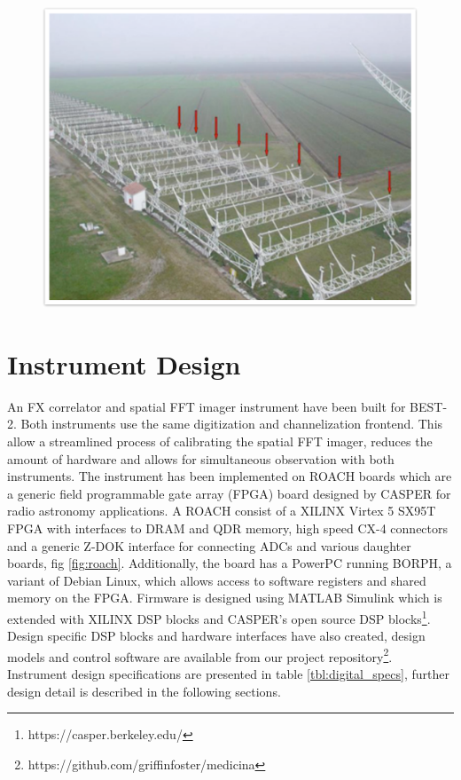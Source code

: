 \documentclass[useAMS,macros,usenatbib,onecolumn]{mn2e}
\begin{document}
\begin{figure}
{    \includegraphics[scale=0.4]{graphics/best2.pdf}
    \label{fig:best2}
    }
    \label{fig:array_layout}
\end{figure}

\section{Instrument Design}
\label{instrument design}

An FX correlator and spatial FFT imager instrument have been built for BEST-2.
Both instruments use the same digitization and channelization frontend.
This allow a streamlined process of calibrating the spatial FFT imager, reduces the amount of hardware and allows for simultaneous observation with both instruments.
The instrument has been implemented on ROACH boards which are a generic field programmable gate array (FPGA) board designed by CASPER for radio astronomy applications.
A ROACH consist of a XILINX Virtex 5 SX95T FPGA with interfaces to DRAM and QDR memory, high speed CX-4 connectors and a generic Z-DOK interface for connecting ADCs and various daughter boards, fig \ref{fig:roach}.
Additionally, the board has a PowerPC running BORPH, a variant of Debian Linux, which allows access to software registers and shared memory on the FPGA.
Firmware is designed using MATLAB Simulink which is extended with XILINX DSP blocks and CASPER's open source DSP blocks\footnote{https://casper.berkeley.edu/}.
Design specific DSP blocks and hardware interfaces have also created, design models and control software are available from our project repository\footnote{https://github.com/griffinfoster/medicina}.
Instrument design specifications are presented in table \ref{tbl:digital_specs}, further design detail is described in the following sections.
\end{document}
